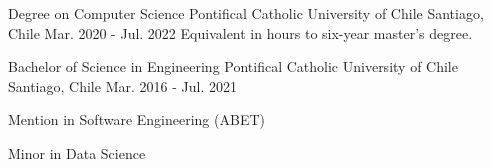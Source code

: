 

\begin{cventries}

  \cventry
  {Degree on Computer Science} %
  {Pontifical Catholic University of Chile} %
  {Santiago, Chile} %
  {Mar. 2020 - Jul. 2022} %
  {Equivalent in hours to six-year master's degree.}

  \cventry
  {Bachelor of Science in Engineering} %
  {Pontifical Catholic University of Chile} %
  {Santiago, Chile} %
  {Mar. 2016 - Jul. 2021} %
  {
    \begin{cvitems} %
      \item {Mention in Software Engineering (ABET)}
      \item {Minor in Data Science}
    \end{cvitems}
  }

\end{cventries}
